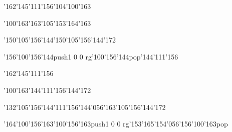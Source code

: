 \null\vfill\ipa\centerline{\enskip\enskip\enskip\enskip\char'162\char'145\char'111\char'156\enskip\enskip\enskip\enskip\char'104\char'100\char'163}\medskip\centerline{\enskip\char'100\char'163\enskip\enskip\enskip\enskip\enskip\enskip\enskip\enskip\char'163\char'105\char'153\char'164\char'163}\medskip\centerline{\enskip\enskip\enskip\enskip\enskip\char'150\char'105\char'156\char'144\enskip\enskip\enskip\enskip\enskip\enskip\enskip\char'150\char'105\char'156\char'144\char'172}\medskip\centerline{\enskip\char'156\char'100\char'156\char'144\enskip\pdfcolorstack\match push{1 0 0 rg}\char'100\char'156\char'144\pdfcolorstack\match pop{}\enskip\char'144\char'111\char'156\enskip\enskip\enskip\enskip}\medskip\vfill\footline{\hfil\tt\folio\hfil}\eject
\null\vfill\ipa\centerline{\enskip\enskip\enskip\enskip\char'162\char'145\char'111\char'156\enskip\enskip\enskip\enskip\enskip\enskip\enskip}\medskip\centerline{\enskip\char'100\char'163\enskip\enskip\enskip\enskip\enskip\enskip\enskip\enskip\char'144\char'111\char'156\char'144\char'172}\medskip\centerline{\enskip\enskip\enskip\enskip\enskip\char'132\char'105\char'156\char'144\enskip\enskip\enskip\enskip\char'111\char'156\char'144\char'056\char'163\char'105\char'156\char'144\char'172}\medskip\centerline{\enskip\char'164\char'100\char'156\char'163\enskip\char'100\char'156\char'163\enskip\pdfcolorstack\match push{1 0 0 rg}\char'153\char'165\char'154\char'056\char'156\char'100\char'163\pdfcolorstack\match pop{}}\medskip\vfill\footline{\hfil\tt\folio\hfil}\eject\bye